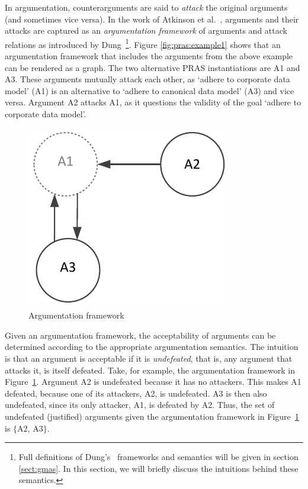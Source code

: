 \documentclass[11.5pt,two column]{llncs}
\begin{document}
In argumentation, counterarguments are said to \emph{attack} the original arguments (and sometimes vice versa). In the work of Atkinson et al.~\cite{atkinson2007}, arguments and their attacks are captured as an \emph{argumentation framework} of arguments and attack relations as introduced by Dung~\cite{Dung1995}\footnote{Full definitions of Dung's~\cite{Dung1995} frameworks and semantics will be given in section \ref{sect:gmas}. In this section, we will briefly discuss the intuitions behind these semantics.}. Figure \ref{fig:pras:example1} shows that an argumentation framework that includes the arguments from the above example can be rendered as a graph. The two alternative PRAS instantiations are A1 and A3. These arguments mutually attack each other, as `adhere to corporate data model' (A1) is an alternative to `adhere to canonical data model' (A3) and vice versa. Argument A2 attacks A1, as it questions the validity of the goal `adhere to corporate data model'. 

\begin{figure}[ht]
\centering
\includegraphics[scale=0.6]{img/Fig1}
\caption{Argumentation framework}
\label{fig:pras:example}
\end{figure}

Given an argumentation framework, the acceptability of arguments can be determined according to the appropriate argumentation semantics. The intuition is that an argument is acceptable if it is \emph{undefeated}, that is, any argument that attacks it, is itself defeated. Take, for example, the argumentation framework in Figure~\ref{fig:pras:example}. Argument A2 is undefeated because it has no attackers. This makes A1 defeated, because one of its attackers, A2, is undefeated. A3 is then also undefeated, since its only attacker, A1, is defeated by A2. Thus, the set of undefeated (justified) arguments given the argumentation framework in Figure~\ref{fig:pras:example} is $\{$A2, A3$\}$. 
\end{document}

